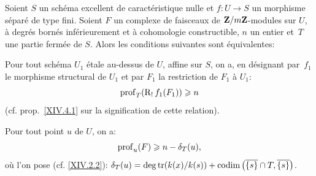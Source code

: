 \setcounter{subsection}{1}

\begin{theoreme} \label{XIV.4.2}
Soient $S$ un sch\'ema excellent de caract\'eristique nulle et \hbox{$f\colon U\!\to\! S$} un morphisme s\'epar\'e de type fini. Soient $F$ un complexe de faisceaux de $\mathbf{Z}/m\mathbf{Z}$-modules sur $U$, \`a degr\'es born\'es inf\'erieurement et \`a cohomologie constructible, $n$ un entier et~$T$ une partie ferm\'ee de $S$. Alors les conditions suivantes sont \'equivalentes:
\begin{enumeratei}
\item
Pour tout sch\'ema $U_{1}$ \'etale au-dessus de $U$, affine sur $S$, on a, en d\'esignant par~$f_{1}$ le morphisme structural de $U_{1}$ et par $F_{1}$ la restriction de $F_{1}$ \`a $U_{1}$:
$$
\operatorname{prof}_{T}(\operatorname{R}_{!}f_{1}(F_{1}))\geqslant n$$
(cf. prop.\, \ref{XIV.4.1} sur la signification de cette relation).
\item
Pour tout point $u$ de $U$, on a:
$$
\operatorname{prof}_{u}(F)\geqslant n-\delta_{T}(u),
$$
o\`u l'on pose (cf. \ref{XIV.2.2}): $\delta_{T}(u)=\operatorname{deg\,tr}(k(x)/k(s))+\operatorname{codim}\big(\overline{\{ s\} }\cap T, \overline{\{ s\} } \big)$.
\end{enumeratei}
\end{theoreme}

